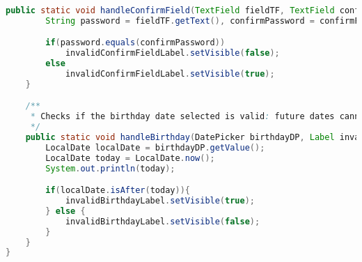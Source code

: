 \begin{lstlisting}[language=Java, caption=Java example]
    public static void handleConfirmField(TextField fieldTF, TextField confirmFieldTF, Label invalidConfirmFieldLabel){
        String password = fieldTF.getText(), confirmPassword = confirmFieldTF.getText();

        if(password.equals(confirmPassword))
            invalidConfirmFieldLabel.setVisible(false);
        else
            invalidConfirmFieldLabel.setVisible(true);
    }

    /**
     * Checks if the birthday date selected is valid: future dates cannot be picked
     */
    public static void handleBirthday(DatePicker birthdayDP, Label invalidBirthdayLabel){
        LocalDate localDate = birthdayDP.getValue();
        LocalDate today = LocalDate.now();
        System.out.println(today);

        if(localDate.isAfter(today)){
            invalidBirthdayLabel.setVisible(true);
        } else {
            invalidBirthdayLabel.setVisible(false);
        }
    }
}

\end{lstlisting}
